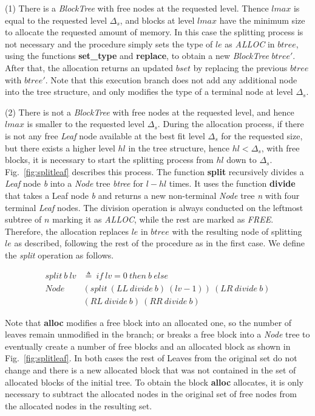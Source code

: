 (1) There is a \emph{BlockTree} with free nodes at the requested level. Thence $lmax$ is equal to the requested level $\Delta_s$, and blocks at level $lmax$ have the minimum size to allocate the requested amount of memory. In this case the splitting process is not necessary and the procedure simply sets the type of $le$ as \emph{ALLOC} in $btree$, using the functions \textbf{set\_type} and \textbf{replace}, to obtain a new \emph{BlockTree} $btree'$. After that, the allocation returns an updated $bset$ by replacing the previous $btree$ with $btree'$. Note that this execution branch does not add any additional node into the tree structure, and only modifies the type of a terminal node at level $\Delta_s$.

(2) There is not a \emph{BlockTree} with free nodes at the requested level, and hence $lmax$ is smaller to the requested level $\Delta_s$. During the allocation process, if there is not any free \emph{Leaf} node available at the best fit level $\Delta_s$ for the requested size, but there exists a higher level $hl$ in the tree structure, hence $hl < \Delta_s$, with free blocks, it is necessary to start the splitting process from $hl$ down to $\Delta_s$. Fig.~\ref{fig:splitleaf} describes this process. The function \textbf{split} recursively divides a \emph{Leaf} node \emph{b} into a \emph{Node} tree \emph{btree} for $l - hl$ times. It uses the function \textbf{divide} that takes a Leaf node \emph{b} and returns a new non-terminal \emph{Node} tree \emph{n} with four terminal \emph{Leaf} nodes. The division operation is always conducted on the leftmost subtree of $n$ marking it as \emph{ALLOC}, while the rest are marked as \emph{FREE}. Therefore, the allocation replaces $le$ in $btree$ with the resulting node of splitting $le$ as described, following the rest of the procedure as in the first case. We define the \emph{split} operation as follows.

\begin{definition} 
\begin{align*}
split\ b\ lv &\triangleq\ if\ lv = 0\ then\ b\ else\\
Node\ &(split\ (LL\ divide\ b)\ (lv - 1))\ (LR\ divide\ b)\\ 
&(RL\ divide\ b)\ (RR\ divide\ b)
\end{align*}
\end{definition}

Note that \textbf{alloc} modifies a free block into an allocated one, so the number of leaves remain unmodified in the branch; or breaks a free block into a \emph{Node} tree to eventually create a number of free blocks and an allocated block as shown in Fig.~\ref{fig:splitleaf}. In both cases the rest of Leaves from the original set do not change and there is a new allocated block that was not contained in the set of allocated blocks of the initial tree. To obtain the block \textbf{alloc} allocates, it is only necessary to subtract the allocated nodes in the original set of free nodes from the allocated nodes in the resulting set.

